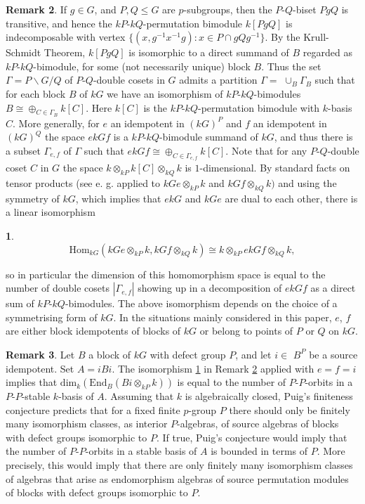 \documentclass{amsart}
\theoremstyle{plain}\newtheorem{Theorem}{Theorem}[section]
\theoremstyle{plain}\newtheorem{Conjecture}[Theorem]{Conjecture}
\theoremstyle{plain}\newtheorem{Corollary}[Theorem]{Corollary}
\theoremstyle{plain}\newtheorem{Lemma}[Theorem]{Lemma}
\theoremstyle{plain}\newtheorem{Proposition}[Theorem]{Proposition}
\theoremstyle{definition}\newtheorem{Definition}[Theorem]{Definition}
\theoremstyle{definition}\newtheorem{Example}[Theorem]{Example}
\theoremstyle{definition}\newtheorem{Examples}[Theorem]{Examples}
\theoremstyle{definition}\newtheorem{Exercise}[Theorem]{Exercise}
\theoremstyle{definition}\newtheorem{Notation}[Theorem]{Notation}
\theoremstyle{definition}\newtheorem{Remark}[Theorem]{Remark}
\theoremstyle{definition}\newtheorem{Remarks}[Theorem]{Remarks}
\theoremstyle{plain}\newtheorem{Statement}[Theorem]{}
\def\dim{\mathrm{dim}}   \def\tenkP{\otimes_{kP}} \def\tenkQ{\otimes_{kQ}}
\def\End{\mathrm{End}}
\def\Hom{\mathrm{Hom}}           \def\tenkS{\otimes_{kS}}
\begin{document}
\begin{Remark} \label{double-coset-Remark}
If $g\in G$, and $ P, Q \leq G $ are  $p$-subgroups,  then the $P$-$Q$-biset 
$PgQ$ is transitive, and hence the 
$kP$-$kQ$-permutation bimodule $k[PgQ]$ is indecomposable with vertex 
$\{ (x, g^{-1}x^{-1} g):  x\in  P\cap gQg^{-1} \} $.
By the Krull-Schmidt Theorem,  $k[PgQ]$ is isomorphic to a direct summand
of $B$ regarded as $kP$-$kQ$-bimodule, for some (not necessarily unique) block $B$.
Thus the set $\Gamma=P\backslash G/Q$ of $P$-$Q$-double cosets in $G$
admits a partition $\Gamma=$
$\cup_{B} \Gamma_B$ such that for each block $B$ of $kG$ we have an
isomorphism of $kP$-$kQ$-bimodules $B\cong \oplus_{C\in \Gamma_B} k[C]$.
Here $k[C]$ is the $kP$-$kQ$-permutation bimodule with $k$-basis $C$.  
More generally, for $e$ an idempotent in $(kG)^P$ and
$f$ an idempotent in $(kG)^Q$
the space  $ekG f$ is a $kP$-$kQ$-bimodule summand of $kG$, and thus there
is a subset $\Gamma_{e,f}$ of $\Gamma$ such that 
$ekGf\cong \oplus_{C\in \Gamma_{e,f} } k[C]$.  Note that for any $P$-$Q$-double 
coset $C$ in $G$ the space 
$k\tenkP k[C] \tenkQ k$ is $1$-dimensional. By standard facts on tensor
products (see e. g. \cite[Proposition 2.9.3]{LiBookI} applied to $kGe\tenkP k$ and 
$kGf\tenkQ k)$  and using the symmetry of $kG$, which implies that $ekG$ and $kGe$ 
are dual to each other,   there is a linear isomorphism
\begin{Statement} \label{double-coset-isom}
$$\Hom_{kG}(kGe \tenkP k, kGf\tenkQ k) \cong k\tenkP ekG f\tenkQ k, $$
\end{Statement}
so in particular the dimension of this homomorphism space is equal to the number of
double cosets $|\Gamma_{e,f}|$ showing up in a decomposition of $ekGf$ as a
direct sum of $kP$-$kQ$-bimodules. The above isomorphism depends on the
choice of a symmetrising form of $kG$. In the situations mainly 
considered in this paper, $e$, $f$ are  either block idempotents of blocks of $kG$ 
or belong to points of $P$ or $Q$ on $kG$. 
\end{Remark}

\begin{Remark} \label{double-cosets-in-A}
Let $B$ a block of $kG$ with defect group $P$, and let
$i\in$ $B^P$ be a source idempotent. Set $A=iBi$.
The isomorphism \ref{double-coset-isom} in Remark \ref{double-coset-Remark}
applied with $e=f=i$ implies that  $\dim_k(\End_B(Bi\tenkP k))$ is equal to the 
number of $P$-$P$-orbits in a $P$-$P$-stable $k$-basis of $A$. 
Assuming that $k$ is algebraically closed,
Puig's finiteness conjecture predicts that for a fixed finite $p$-group $P$ there 
should only be finitely many isomorphism classes, as interior $P$-algebras,
of source algebras of blocks with defect groups isomorphic to $P$. If true,
Puig's conjecture would  imply  that the number of $P$-$P$-orbits in a stable 
basis of $A$ is  bounded in terms of $P$. More precisely, this would imply
that there are only finitely many isomorphism 
classes of algebras that arise as endomorphism algebras of source permutation 
modules of blocks with defect groups isomorphic to $P$. \end{Remark}
\end{document}
